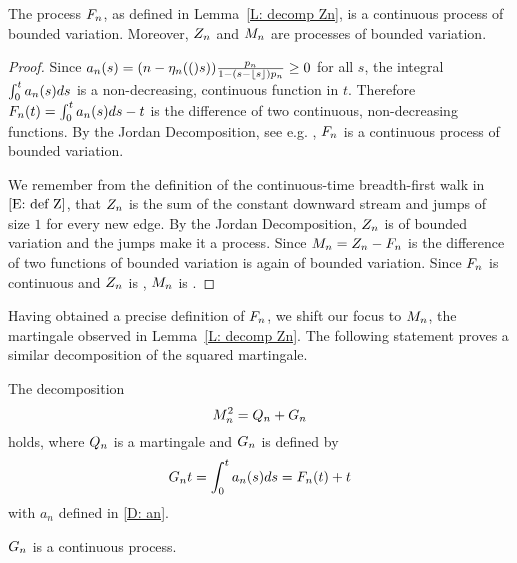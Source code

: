 \begin{corollary}
	The process $F_n$, as defined in Lemma~\ref{L: decomp Zn}, is a continuous process of bounded variation.
	Moreover, $Z_n$ and $M_n$ are \cadlag processes of bounded variation.
\end{corollary}

\begin{proof}
	Since $a_n(s) = (n - \eta_n(()s)) \frac{p_n}{1-(s-\lfloor s\rfloor)p_n} \geq 0$ for all $s$,
	the integral $\int_{0}^{t}a_n(s)ds$ is a non-decreasing, continuous function in $t$.
	Therefore $F_n(t) = \int_{0}^{t}a_n(s)ds -t$ is the difference of two continuous, non-decreasing functions.
	By the Jordan Decomposition, see e.g. \cite{Mikosch2009}, $F_n$ is a continuous process of bounded variation.
	
	We remember from the definition of the continuous-time breadth-first walk in $\eqref{E: def Z}$,
	that $Z_n$ is the sum of the constant downward stream and jumps of size $1$ for every new edge.
	By the Jordan Decomposition, $Z_n$ is of bounded variation and the jumps make it a \cadlag process.
	Since $M_n = Z_n - F_n$ is the difference of two functions of bounded variation is again of bounded variation.
	Since $F_n$ is continuous and $Z_n$ is \cadlag, $M_n$ is \cadlag.
\end{proof}



Having obtained a precise definition of $F_n$, we shift our focus to $M_n$, the martingale observed in Lemma~\ref{L: decomp Zn}.
The following statement proves a similar decomposition of the squared martingale.

\begin{lemma} \label{L: decomp Mn}
	The decomposition
	\begin{equation} \label{E: decomp Mn}
	M_n^2 = Q_n + G_n
	\end{equation}
	holds, where $Q_n$ is a martingale and $G_n$ is defined by 
	\begin{equation} \label{D: Bn}
	G_n{t} = \int_{0}^{t} a_n(s)ds = F_n(t) + t
	\end{equation}
	with $a_n$ defined in \eqref{D: an}.
\end{lemma}
\begin{note} \label{N: decomp Mn}
	$G_n$ is a continuous process.
\end{note}

